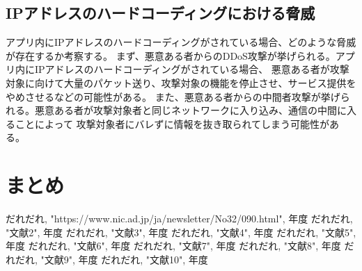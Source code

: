 \documentclass[a4j]{jarticle}
\begin{document}
\subsection{IPアドレスのハードコーディングにおける脅威}
アプリ内にIPアドレスのハードコーディングがされている場合、どのような脅威が存在するか考察する。
まず、悪意ある者からのDDoS攻撃が挙げられる。アプリ内にIPアドレスのハードコーディングがされている場合、
悪意ある者が攻撃対象に向けて大量のパケット送り、攻撃対象の機能を停止させ、サービス提供をやめさせるなどの可能性がある。
また、悪意ある者からの中間者攻撃が挙げられる。悪意ある者が攻撃対象者と同じネットワークに入り込み、通信の中間に入ることによって
攻撃対象者にバレずに情報を抜き取られてしまう可能性がある。
\newpage
\section{まとめ}

\newpage
\begin{thebibliography}{99}
だれだれ, "https://www.nic.ad.jp/ja/newsletter/No32/090.html", 年度
だれだれ, "文献2", 年度
だれだれ, "文献3", 年度
だれだれ, "文献4", 年度
だれだれ, "文献5", 年度
だれだれ, "文献6", 年度
だれだれ, "文献7", 年度
だれだれ, "文献8", 年度
だれだれ, "文献9", 年度
だれだれ, "文献10", 年度

\end{thebibliography}
\end{document}
